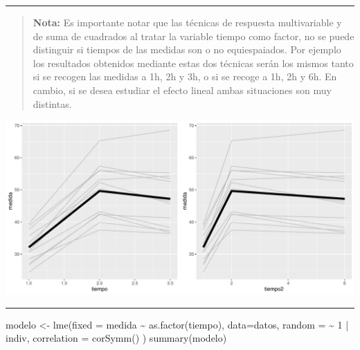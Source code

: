 \documentclass[
]{book}
\newenvironment{Shaded}{\begin{snugshade}}{\end{snugshade}}
\newcommand{\AttributeTok}[1]{\textcolor[rgb]{0.77,0.63,0.00}{#1}}
\newcommand{\DecValTok}[1]{\textcolor[rgb]{0.00,0.00,0.81}{#1}}
\newcommand{\FunctionTok}[1]{\textcolor[rgb]{0.00,0.00,0.00}{#1}}
\newcommand{\NormalTok}[1]{#1}
\newcommand{\OtherTok}[1]{\textcolor[rgb]{0.56,0.35,0.01}{#1}}
\newcommand{\SpecialCharTok}[1]{\textcolor[rgb]{0.00,0.00,0.00}{#1}}
\begin{document}
\begin{center}\rule{0.5\linewidth}{0.5pt}\end{center}

\begin{quote}
\textbf{Nota:} Es importante notar que las técnicas de respuesta multivariable y de suma de cuadrados al tratar la variable tiempo como factor, no se puede distinguir si tiempos de las medidas son o no equiespaiados. Por ejemplo los resultados obtenidos mediante estas dos técnicas serán los mismos tanto si se recogen las medidas a 1h, 2h y 3h, o si se recoge a 1h, 2h y 6h. En cambio, si se desea estudiar el efecto lineal ambas situaciones son muy distintas.
\end{quote}

\includegraphics{fig_out/unnamed-chunk-96-1.pdf}

\begin{center}\rule{0.5\linewidth}{0.5pt}\end{center}

\begin{Shaded}
\begin{Highlighting}[]
\NormalTok{modelo }\OtherTok{\textless{}{-}} \FunctionTok{lme}\NormalTok{(}\AttributeTok{fixed =}\NormalTok{ medida }\SpecialCharTok{\textasciitilde{}} \FunctionTok{as.factor}\NormalTok{(tiempo), }
              \AttributeTok{data=}\NormalTok{datos,}
              \AttributeTok{random =} \SpecialCharTok{\textasciitilde{}} \DecValTok{1} \SpecialCharTok{|}\NormalTok{ indiv,}
              \AttributeTok{correlation =} \FunctionTok{corSymm}\NormalTok{()}
\NormalTok{              )}
\FunctionTok{summary}\NormalTok{(modelo)}
\end{Highlighting}
\end{Shaded}
\end{document}
